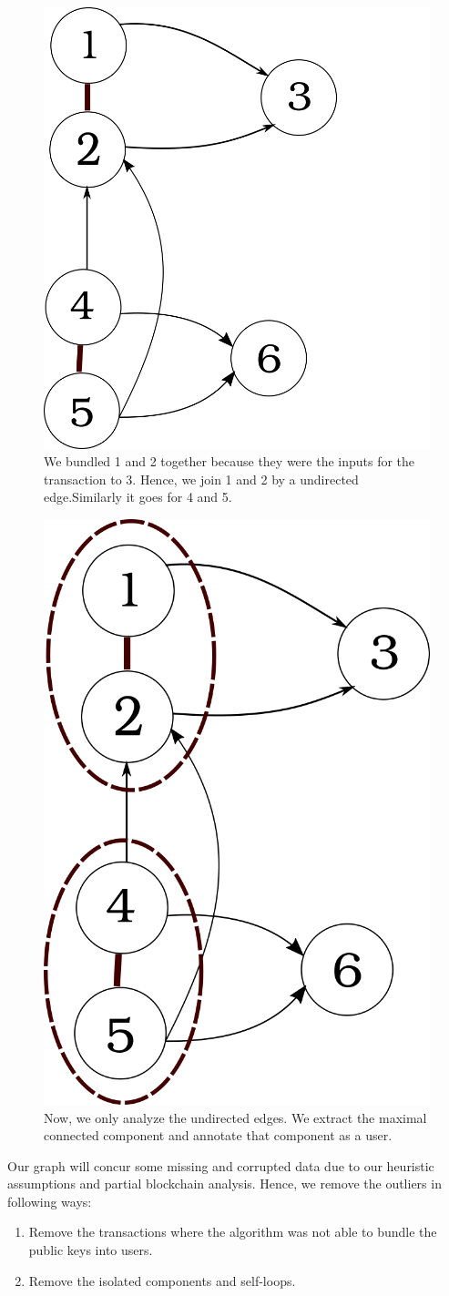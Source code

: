 \documentclass[runningheads,a4paper]{llncs}[2017/09/04]
\begin{document}
\begin{figure}[!htb]
	\centering 
	\includegraphics[width=0.4\columnwidth]{bitmap1} 
	\caption{We bundled 1 and 2 together because they were the inputs for the transaction to 3. Hence, we join 1 and 2 by a undirected edge.Similarly it goes for 4 and 5.} %
	\label{a2}
\end{figure}

\begin{figure}[!htb]
	\centering 
	\includegraphics[width=0.4\columnwidth]{bitmap2} 
	\caption{Now, we only analyze the undirected edges. We extract the maximal connected component and annotate that component as a user.} %
	\label{a3}
\end{figure}

Our graph will concur some missing and corrupted data due to our heuristic assumptions and partial blockchain analysis.
Hence, we remove the outliers in following ways:
\begin{enumerate}
	\item Remove the transactions where the algorithm was not able to bundle the public keys into users.
	\item Remove the isolated components and self-loops.
\end{enumerate}
\end{document}
